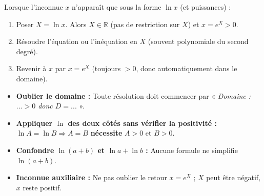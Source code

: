 \documentclass[11pt]{article}
\begin{document}
\begin{methode}
Lorsque l'inconnue $x$ n'apparaît que sous la forme $\ln x$ (et puissances) :
\begin{enumerate}
  \item Poser $X = \ln x$. Alors $X \in \mathbb{R}$ (pas de restriction sur $X$) et $x = e^X > 0$.
  \item Résoudre l'équation ou l'inéquation en $X$ (souvent polynomiale du second degré).
  \item Revenir à $x$ par $x = e^X$ (toujours $>0$, donc automatiquement dans le domaine).
\end{enumerate}
\end{methode}

\begin{attention}
\begin{itemize}
  \item \textbf{Oublier le domaine :} Toute résolution doit commencer par « \emph{Domaine : $...>0$ donc $D=...$} ».
  \item \textbf{Appliquer $\ln$ des deux côtés sans vérifier la positivité :} $\ln A = \ln B \Rightarrow A=B$ \textbf{nécessite} $A>0$ et $B>0$.
  \item \textbf{Confondre $\ln(a+b)$ et $\ln a + \ln b$ :} Aucune formule ne simplifie $\ln(a+b)$.
  \item \textbf{Inconnue auxiliaire :} Ne pas oublier le retour $x=e^X$ ; $X$ peut être négatif, $x$ reste positif.
\end{itemize}
\end{attention}
\end{document}
